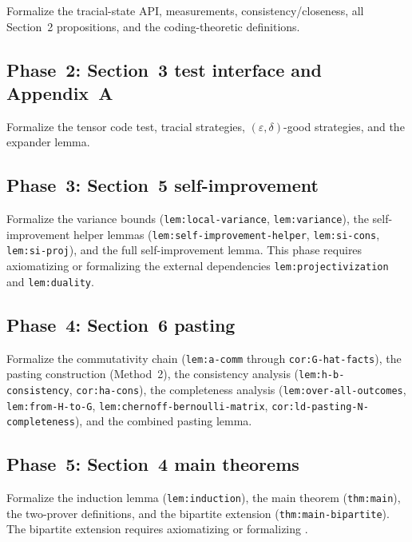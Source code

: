 \documentclass{article}
\theoremstyle{remark}
\newcommand{\eps}{\varepsilon}
\begin{document}
Formalize the tracial-state API, measurements, consistency/closeness, all
Section~2 propositions, and the coding-theoretic definitions.

\subsection{Phase~2: Section~3 test interface and Appendix~A}

Formalize the tensor code test, tracial strategies,
$(\eps,\delta)$-good strategies, and the expander lemma.

\subsection{Phase~3: Section~5 self-improvement}

Formalize the variance bounds (\texttt{lem:local-variance},
\texttt{lem:variance}), the self-improvement helper lemmas
(\texttt{lem:self-improvement-helper}, \texttt{lem:si-cons},
\texttt{lem:si-proj}), and the full self-improvement lemma.
This phase requires axiomatizing or formalizing the external dependencies
\texttt{lem:projectivization} and \texttt{lem:duality}.

\subsection{Phase~4: Section~6 pasting}

Formalize the commutativity chain
(\texttt{lem:a-comm} through \texttt{cor:G-hat-facts}),
the pasting construction (Method~2), the consistency analysis
(\texttt{lem:h-b-consistency}, \texttt{cor:ha-cons}),
the completeness analysis
(\texttt{lem:over-all-outcomes}, \texttt{lem:from-H-to-G},
\texttt{lem:chernoff-bernoulli-matrix}, \texttt{cor:ld-pasting-N-completeness}),
and the combined pasting lemma.

\subsection{Phase~5: Section~4 main theorems}

Formalize the induction lemma (\texttt{lem:induction}),
the main theorem (\texttt{thm:main}), the two-prover definitions,
and the bipartite extension (\texttt{thm:main-bipartite}).
The bipartite extension requires axiomatizing or formalizing
\cite{vidick2021almost}.
\end{document}
